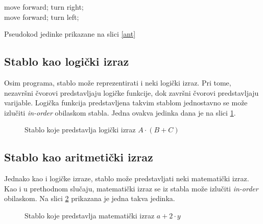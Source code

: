 \begin{algorithm}
 {
	move forward;
} {
	turn right;\\
	 {
		move forward;
	} {
		turn left;
	}
}

	\caption{Pseudokod jedinke prikazane na slici \ref{ant}}
	\label{pseudokod}
	\centering
\end{algorithm}

\subsection{Stablo kao logički izraz}

Osim programa, stablo može reprezentirati i neki logički izraz. Pri tome, nezavršni čvorovi predstavljaju logičke funkcije, dok završni čvorovi predstavljaju varijable. Logička funkcija predstavljena takvim stablom jednostavno se može izlučiti \textit{in-order} obilaskom stabla. Jedna ovakva jedinka dana je na slici \ref{logTree}. 
\\
\begin{figure}[H]
	\centering
	\caption{Stablo koje predstavlja logički izraz $A  \cdot (B + C)$}
	\label{logTree}
\end{figure}


\subsection{Stablo kao aritmetički izraz}

Jednako kao i logičke izraze, stablo može predstavljati neki matematički izraz. Kao i u prethodnom slučaju, matematički izraz se iz stabla može izlučiti \textit{in-order} obilaskom. Na slici \ref{matTree} prikazana je jedna takva jedinka.

\begin{figure}[H]
	\centering
	\caption{Stablo koje predstavlja matematički izraz $a + 2 \cdot y$}
	\label{matTree}
\end{figure}


